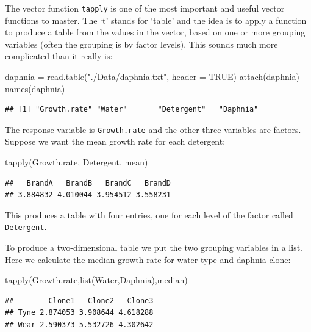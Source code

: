 \documentclass[
]{book}
\newenvironment{Shaded}{\begin{snugshade}}{\end{snugshade}}
\newcommand{\AttributeTok}[1]{\textcolor[rgb]{0.77,0.63,0.00}{#1}}
\newcommand{\ConstantTok}[1]{\textcolor[rgb]{0.00,0.00,0.00}{#1}}
\newcommand{\FunctionTok}[1]{\textcolor[rgb]{0.00,0.00,0.00}{#1}}
\newcommand{\NormalTok}[1]{#1}
\newcommand{\OtherTok}[1]{\textcolor[rgb]{0.56,0.35,0.01}{#1}}
\newcommand{\StringTok}[1]{\textcolor[rgb]{0.31,0.60,0.02}{#1}}
\begin{document}
The vector function \texttt{tapply} is one of the most important and useful vector functions to master. The `t' stands for `table' and the idea is to apply a function to produce a table from the values in the vector, based on one or more grouping variables (often the grouping is by factor levels). This sounds much more complicated than it really is:

\begin{Shaded}
\begin{Highlighting}[]
\NormalTok{daphnia }\OtherTok{=} \FunctionTok{read.table}\NormalTok{(}\StringTok{"./Data/daphnia.txt"}\NormalTok{, }\AttributeTok{header =} \ConstantTok{TRUE}\NormalTok{)}
\FunctionTok{attach}\NormalTok{(daphnia)}
\FunctionTok{names}\NormalTok{(daphnia)}
\end{Highlighting}
\end{Shaded}

\begin{verbatim}
## [1] "Growth.rate" "Water"       "Detergent"   "Daphnia"
\end{verbatim}

The response variable is \texttt{Growth.rate} and the other three variables are factors. Suppose we want the mean growth rate for each detergent:

\begin{Shaded}
\begin{Highlighting}[]
\FunctionTok{tapply}\NormalTok{(Growth.rate, Detergent, mean)}
\end{Highlighting}
\end{Shaded}

\begin{verbatim}
##   BrandA   BrandB   BrandC   BrandD 
## 3.884832 4.010044 3.954512 3.558231
\end{verbatim}

This produces a table with four entries, one for each level of the factor called \texttt{Detergent}.

To produce a two-dimensional table we put the two grouping variables in a list. Here we calculate the median growth rate for water type and daphnia clone:

\begin{Shaded}
\begin{Highlighting}[]
\FunctionTok{tapply}\NormalTok{(Growth.rate,}\FunctionTok{list}\NormalTok{(Water,Daphnia),median)}
\end{Highlighting}
\end{Shaded}

\begin{verbatim}
##        Clone1   Clone2   Clone3
## Tyne 2.874053 3.908644 4.618288
## Wear 2.590373 5.532726 4.302642
\end{verbatim}
\end{document}
